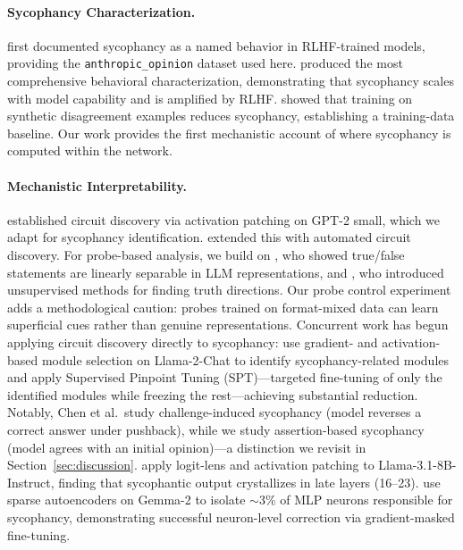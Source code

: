 \documentclass{article}
\begin{document}
\paragraph{Sycophancy Characterization.}
\citet{perez2022discovering} first documented sycophancy as a named behavior in RLHF-trained models, providing the \texttt{anthropic\_opinion} dataset used here. \citet{sharma2024towards} produced the most comprehensive behavioral characterization, demonstrating that sycophancy scales with model capability and is amplified by RLHF. \citet{wei2023simple} showed that training on synthetic disagreement examples reduces sycophancy, establishing a training-data baseline. Our work provides the first mechanistic account of where sycophancy is computed within the network.

\paragraph{Mechanistic Interpretability.}
\citet{wang2022interpretability} established circuit discovery via activation patching on GPT-2 small, which we adapt for sycophancy identification. \citet{conmy2023towards} extended this with automated circuit discovery. For probe-based analysis, we build on \citet{marks2023geometry}, who showed true/false statements are linearly separable in LLM representations, and \citet{burns2023discovering}, who introduced unsupervised methods for finding truth directions. Our probe control experiment adds a methodological caution: probes trained on format-mixed data can learn superficial cues rather than genuine representations. Concurrent work has begun applying circuit discovery directly to sycophancy: \citet{chen2024pinpoint} use gradient- and activation-based module selection on Llama-2-Chat to identify sycophancy-related modules and apply Supervised Pinpoint Tuning (SPT)---targeted fine-tuning of only the identified modules while freezing the rest---achieving substantial reduction. Notably, Chen et al.\ study challenge-induced sycophancy (model reverses a correct answer under pushback), while we study assertion-based sycophancy (model agrees with an initial opinion)---a distinction we revisit in Section~\ref{sec:discussion}. \citet{li2025truth} apply logit-lens and activation patching to Llama-3.1-8B-Instruct, finding that sycophantic output crystallizes in late layers (16--23). \citet{obrien2026fewbad} use sparse autoencoders on Gemma-2 to isolate ${\sim}3\%$ of MLP neurons responsible for sycophancy, demonstrating successful neuron-level correction via gradient-masked fine-tuning.
\end{document}
